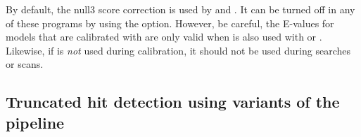 %

By default, the null3 score correction is used by  and . It can be turned off in any of these
programs by using the  option. However, be careful,
the E-values for models that are calibrated with  are
only valid when  is also used with  or
. Likewise, if  is \emph{not} used during
calibration, it should not be used during searches or scans.

\subsection{Truncated hit detection using variants of the pipeline}

